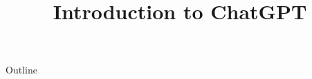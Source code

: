 \documentclass[xcolor=dvipsnames,compress,t,pdf,9pt]{beamer}
\title[\insertframenumber /\inserttotalframenumber]{Introduction to ChatGPT}
\begin{document}
	\begin{frame}
	\titlepage
	\end{frame}
	
	\begin{frame}{Outline}
	    \tableofcontents
	\end{frame}

	
	
	
\end{document}
